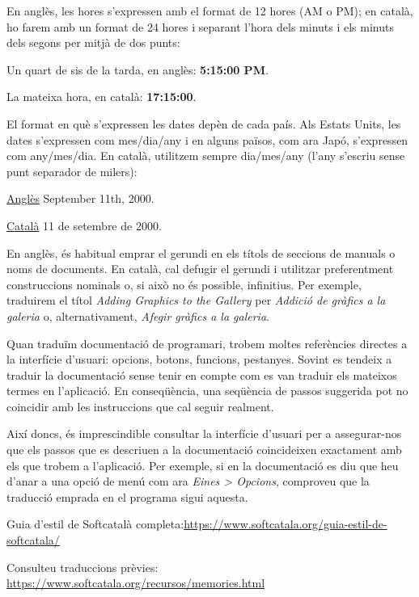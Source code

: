 \documentclass[9pt]{cheatsheet}
\begin{document}
\begin{multicols*}{3}

En anglès, les hores s’expressen amb el format de 12 hores (AM o PM); en català, ho farem amb un format de 24 hores i separant l’hora dels minuts i els minuts dels segons per mitjà de dos punts:

Un quart de sis de la tarda, en anglès: \textbf{5:15:00 PM}.

La mateixa hora, en català: \textbf{17:15:00}.


El format en què s’expressen les dates depèn de cada país. Als Estats Units, les dates s’expressen com mes/dia/any i en alguns països, com ara Japó, s’expressen com any/mes/dia. En català, utilitzem sempre dia/mes/any (l’any s’escriu sense punt separador de milers):

\underline {Anglès} September 11th, 2000.

\underline {Català}	11 de setembre de 2000.



En anglès, és habitual emprar el gerundi en els títols de seccions de manuals o noms de documents. En català, cal defugir el gerundi i utilitzar preferentment construccions nominals o, si això no és possible, infinitius. Per exemple, traduirem el títol \emph{Adding Graphics to the Gallery} per \emph{Addició de gràfics a la galeria} o, alternativament, \emph{Afegir gràfics a la galeria}.


Quan traduïm documentació de programari, trobem moltes referències directes a la interfície d’usuari: opcions, botons, funcions, pestanyes. Sovint es tendeix a traduir la documentació sense tenir en compte com es van traduir els mateixos termes en l’aplicació. En conseqüència, una seqüència de passos suggerida pot no coincidir amb les instruccions que cal seguir realment. 

Així doncs, és imprescindible consultar la interfície d’usuari per a assegurar-nos que els passos que es descriuen a la documentació coincideixen exactament amb els que trobem a l’aplicació. Per exemple, si en la documentació es diu que heu d’anar a una opció de menú com ara \emph{Eines > Opcions}, comproveu que la traducció emprada en el programa sigui aquesta.


Guia d'estil de Softcatalà completa:\url{https://www.softcatala.org/guia-estil-de-softcatala/}

Consulteu traduccions prèvies: \url{https://www.softcatala.org/recursos/memories.html}

\end{multicols*}
\end{document}
